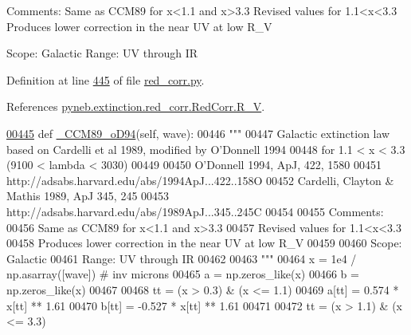 \begin{DoxyVerb}
\begin{DoxyVerb}
Comments:
Same as CCM89 for x<1.1 and x>3.3
Revised values for 1.1<x<3.3
Produces lower correction in the near UV at low R_V

Scope: Galactic
Range: UV through IR\end{DoxyVerb}
 

Definition at line \hyperlink{red__corr_8py_source_l00445}{445} of file \hyperlink{red__corr_8py_source}{red\+\_\+corr.\+py}.



References \hyperlink{red__corr_8py_source_l00204}{pyneb.\+extinction.\+red\+\_\+corr.\+Red\+Corr.\+R\+\_\+\+V}.


\begin{DoxyCode}
\hypertarget{classpyneb_1_1extinction_1_1red__corr_1_1_red_corr_l00445}{}\hyperlink{classpyneb_1_1extinction_1_1red__corr_1_1_red_corr_a87841a3694fd368a8583680623936e29}{00445}     \textcolor{keyword}{def }\hyperlink{classpyneb_1_1extinction_1_1red__corr_1_1_red_corr_a87841a3694fd368a8583680623936e29}{\_CCM89\_oD94}(self, wave):
00446         \textcolor{stringliteral}{"""}
00447 \textcolor{stringliteral}{        Galactic extinction law based on Cardelli et al 1989, modified by O'Donnell 1994}
00448 \textcolor{stringliteral}{        for 1.1 < x < 3.3 (9100 < lambda < 3030)}
00449 \textcolor{stringliteral}{        }
00450 \textcolor{stringliteral}{        O'Donnell 1994, ApJ, 422, 1580}
00451 \textcolor{stringliteral}{        http://adsabs.harvard.edu/abs/1994ApJ...422..158O}
00452 \textcolor{stringliteral}{        Cardelli, Clayton & Mathis 1989, ApJ 345, 245}
00453 \textcolor{stringliteral}{        http://adsabs.harvard.edu/abs/1989ApJ...345..245C}
00454 \textcolor{stringliteral}{}
00455 \textcolor{stringliteral}{        Comments:}
00456 \textcolor{stringliteral}{        Same as CCM89 for x<1.1 and x>3.3}
00457 \textcolor{stringliteral}{        Revised values for 1.1<x<3.3}
00458 \textcolor{stringliteral}{        Produces lower correction in the near UV at low R\_V}
00459 \textcolor{stringliteral}{        }
00460 \textcolor{stringliteral}{        Scope: Galactic}
00461 \textcolor{stringliteral}{        Range: UV through IR}
00462 \textcolor{stringliteral}{        }
00463 \textcolor{stringliteral}{        """}
00464         x = 1e4 / np.asarray([wave]) \textcolor{comment}{# inv microns}
00465         a = np.zeros\_like(x)
00466         b = np.zeros\_like(x)
00467         
00468         tt = (x > 0.3) & (x <= 1.1)
00469         a[tt] = 0.574 * x[tt] ** 1.61 
00470         b[tt] = -0.527 * x[tt] ** 1.61
00471     
00472         tt = (x > 1.1) & (x <= 3.3)

\end{DoxyCode}
\end{DoxyVerb}
